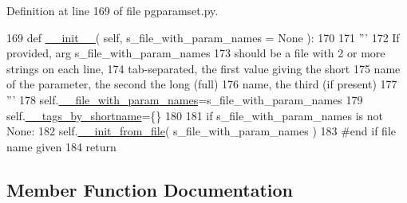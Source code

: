 Definition at line 169 of file pgparamset.\+py.


\begin{DoxyCode}
169     \textcolor{keyword}{def }\hyperlink{classnegui_1_1pgparamset_1_1PGParamSet_a598ea6a166f56fe5be01f86d4d8c91ba}{\_\_init\_\_}( self, s\_file\_with\_param\_names = None ):
170 
171         \textcolor{stringliteral}{'''}
172 \textcolor{stringliteral}{        If provided, arg s\_file\_with\_param\_names}
173 \textcolor{stringliteral}{        should be a file with 2 or more strings on each line,}
174 \textcolor{stringliteral}{        tab-separated, the first value giving the short}
175 \textcolor{stringliteral}{        name of the parameter, the second the long (full)}
176 \textcolor{stringliteral}{        name, the third (if present)}
177 \textcolor{stringliteral}{        '''}
178         self.\hyperlink{classnegui_1_1pgparamset_1_1PGParamSet_aafa67026a09aa523151728cba95e0d6d}{\_\_file\_with\_param\_names}=s\_file\_with\_param\_names
179         self.\hyperlink{classnegui_1_1pgparamset_1_1PGParamSet_aa13eaff9049bc16fa4090c8b85915f3c}{\_\_tags\_by\_shortname}=\{\}
180 
181         \textcolor{keywordflow}{if} s\_file\_with\_param\_names \textcolor{keywordflow}{is} \textcolor{keywordflow}{not} \textcolor{keywordtype}{None}:
182             self.\hyperlink{classnegui_1_1pgparamset_1_1PGParamSet_abc19f133ab3ecc86ec8099549b0b45bb}{\_\_init\_from\_file}( s\_file\_with\_param\_names )
183         \textcolor{comment}{#end if file name given}
184         \textcolor{keywordflow}{return}
\end{DoxyCode}


\subsection{Member Function Documentation}
